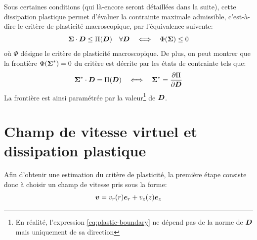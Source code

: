 \documentclass[french,12pt]{exam}
\begin{document}
Sous certaines conditions (qui là-encore seront détaillées dans la suite), cette dissipation plastique permet d'évaluer la contrainte maximale admissible, c'est-à-dire le critère de plasticité macroscopique, par l'équivalence suivente:
\begin{equation}
  \boldsymbol{\Sigma} \cdot \boldsymbol{D} \leq \Pi(\boldsymbol{D}) \quad \forall \boldsymbol{D} \quad \Longleftrightarrow \quad \Phi(\boldsymbol{\Sigma}) \leq 0 \label{eq2}
\end{equation}
où $\Phi$ désigne le critère de plasticité macroscopique. De plus, on peut montrer que la frontière $\Phi(\boldsymbol{\Sigma}^*)=0$ du critère est décrite par les états de contrainte tels que:
\begin{equation}
\boldsymbol{\Sigma}^*\cdot\boldsymbol{D} = \Pi(\boldsymbol{D}) \quad \Longleftrightarrow \quad \boldsymbol{\Sigma}^* = \dfrac{\partial \Pi}{\partial \boldsymbol{D}}
  \label{eq:plastic-boundary}
\end{equation}
La frontière est ainsi paramétrée par la valeur\footnote{En réalité, l'expression \eqref{eq:plastic-boundary} ne dépend pas de la norme de $\boldsymbol{D}$ mais uniquement de sa direction} de $\boldsymbol{D}$.

\section{Champ de vitesse virtuel et dissipation plastique}

Afin d'obtenir une estimation du critère de plasticité, la première étape consiste donc à choisir un champ de vitesse pris sous la forme:
\begin{equation}
  \boldsymbol{v} = v_r(r) \boldsymbol{e}_r + v_z(z) \boldsymbol{e}_z \label{eq:champ-vitesse}
\end{equation}
\end{document}
